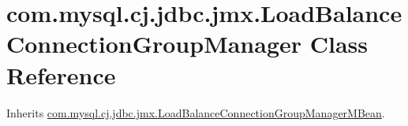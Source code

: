 \hypertarget{classcom_1_1mysql_1_1cj_1_1jdbc_1_1jmx_1_1_load_balance_connection_group_manager}{}\section{com.\+mysql.\+cj.\+jdbc.\+jmx.\+Load\+Balance\+Connection\+Group\+Manager Class Reference}
\label{classcom_1_1mysql_1_1cj_1_1jdbc_1_1jmx_1_1_load_balance_connection_group_manager}


Inherits \mbox{\hyperlink{interfacecom_1_1mysql_1_1cj_1_1jdbc_1_1jmx_1_1_load_balance_connection_group_manager_m_bean}{com.\+mysql.\+cj.\+jdbc.\+jmx.\+Load\+Balance\+Connection\+Group\+Manager\+M\+Bean}}.

